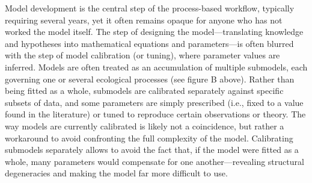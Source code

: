 \documentclass[11pt]{article}
\begin{document}
\begin{tcolorbox}
{\begin{multicols}{2}
\begin{minipage}[t]{\linewidth}
    \vspace*{1mm}
\end{minipage}

\noindent %
Model development is the central step of the process-based workflow, typically requiring several years, yet it often remains opaque for anyone who has not worked the model itself. The step of designing the model---translating knowledge and hypotheses into mathematical equations and parameters---is often blurred with the step of model calibration (or tuning), where parameter values are inferred. Models are often treated as an accumulation of multiple submodels, each governing one or several ecological processes (see figure B above). Rather than being fitted as a whole, submodels are calibrated separately against specific subsets of data, and some parameters are simply prescribed (i.e., fixed to a value found in the literature) or tuned to reproduce certain observations or theory. The way models are currently calibrated is likely not a coincidence, but rather a workaround to avoid confronting the full complexity of the model. Calibrating submodels separately allows to avoid the fact that, if the model were fitted as a whole, many parameters would compensate for one another---revealing structural degeneracies and making the model far more difficult to use.

\vfill

\end{multicols}}


\end{tcolorbox}
\end{document}
